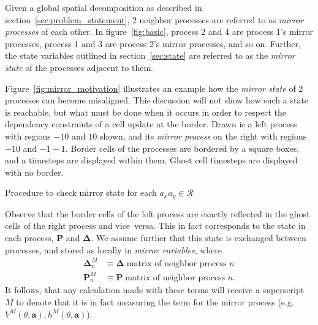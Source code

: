 Given a global spatial decomposition as described in section~\ref{sec:problem_statement},
2 neighbor processes are referred to as
{\it mirror processes} of each other.  In figure~\ref{fig:basic}, process 2 and 4 are process 1's mirror
processes, process 1 and 3 are process 2's mirror processes, and so on.  Further,
the state variables outlined in section~\ref{sec:state} are referred to as the
{\it mirror state} of the processes adjacent to them.

Figure~\ref{fig:mirror_motivation} illustrates an example how the {\it mirror state}
of 2 processes can become misaligned.  This discussion will not show how such a state
is reachable, but what must be done when it occurs in order to respect the dependency
constraints of a cell update at the border.
Drawn is a left process with regions $-10$ and $10$ shown,
and its {\it mirror process} on the right with regions $-10$ and $-1-1$.  Border cells
of the processes are bordered by a square boxes, and a timesteps are displayed within them.
Ghost cell timesteps are displayed with no border.
\begin{algorithm}[h]
  \setcounter{AlgoLine}{0}
  \caption{Procedure to check mirror state for each
  $a_xa_y \in \mathcal{R}$}
  \label{alg:mirror_guard}
\end{algorithm}
Observe that the border cells
of the left process are exactly reflected in the ghost cells of the right process and
vice~versa.  This in fact corresponds to the state in each process, $\mathbf{P}$ and
$\mathbf{\Delta}$.  We assume further that this state is exchanged between processes,
and stored as locally in {\it mirror variables}, where
\begin{eqnarray}
  \mathbf{\Delta}_n^M &\equiv \mathbf{\Delta}\;\text{matrix of neighbor process $n$}\\
  \mathbf{P}_n^M &\equiv \mathbf{P}\;\text{matrix of neighbor process $n$}.
\end{eqnarray}
It follows, that any calculation made with these terms will receive a superscript $M$
to denote that it is in fact measuring the term for the mirror process (e.g.
$V^M(\theta, \mathbf{a}), h^M(\theta, \mathbf{a})$).

